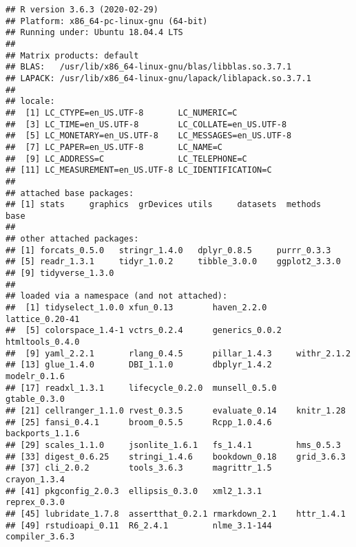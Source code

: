 \documentclass[]{bxjsarticle}
\begin{document}
\begin{verbatim}
## R version 3.6.3 (2020-02-29)
## Platform: x86_64-pc-linux-gnu (64-bit)
## Running under: Ubuntu 18.04.4 LTS
## 
## Matrix products: default
## BLAS:   /usr/lib/x86_64-linux-gnu/blas/libblas.so.3.7.1
## LAPACK: /usr/lib/x86_64-linux-gnu/lapack/liblapack.so.3.7.1
## 
## locale:
##  [1] LC_CTYPE=en_US.UTF-8       LC_NUMERIC=C              
##  [3] LC_TIME=en_US.UTF-8        LC_COLLATE=en_US.UTF-8    
##  [5] LC_MONETARY=en_US.UTF-8    LC_MESSAGES=en_US.UTF-8   
##  [7] LC_PAPER=en_US.UTF-8       LC_NAME=C                 
##  [9] LC_ADDRESS=C               LC_TELEPHONE=C            
## [11] LC_MEASUREMENT=en_US.UTF-8 LC_IDENTIFICATION=C       
## 
## attached base packages:
## [1] stats     graphics  grDevices utils     datasets  methods   base     
## 
## other attached packages:
## [1] forcats_0.5.0   stringr_1.4.0   dplyr_0.8.5     purrr_0.3.3    
## [5] readr_1.3.1     tidyr_1.0.2     tibble_3.0.0    ggplot2_3.3.0  
## [9] tidyverse_1.3.0
## 
## loaded via a namespace (and not attached):
##  [1] tidyselect_1.0.0 xfun_0.13        haven_2.2.0      lattice_0.20-41 
##  [5] colorspace_1.4-1 vctrs_0.2.4      generics_0.0.2   htmltools_0.4.0 
##  [9] yaml_2.2.1       rlang_0.4.5      pillar_1.4.3     withr_2.1.2     
## [13] glue_1.4.0       DBI_1.1.0        dbplyr_1.4.2     modelr_0.1.6    
## [17] readxl_1.3.1     lifecycle_0.2.0  munsell_0.5.0    gtable_0.3.0    
## [21] cellranger_1.1.0 rvest_0.3.5      evaluate_0.14    knitr_1.28      
## [25] fansi_0.4.1      broom_0.5.5      Rcpp_1.0.4.6     backports_1.1.6 
## [29] scales_1.1.0     jsonlite_1.6.1   fs_1.4.1         hms_0.5.3       
## [33] digest_0.6.25    stringi_1.4.6    bookdown_0.18    grid_3.6.3      
## [37] cli_2.0.2        tools_3.6.3      magrittr_1.5     crayon_1.3.4    
## [41] pkgconfig_2.0.3  ellipsis_0.3.0   xml2_1.3.1       reprex_0.3.0    
## [45] lubridate_1.7.8  assertthat_0.2.1 rmarkdown_2.1    httr_1.4.1      
## [49] rstudioapi_0.11  R6_2.4.1         nlme_3.1-144     compiler_3.6.3
\end{verbatim}


\end{document}

